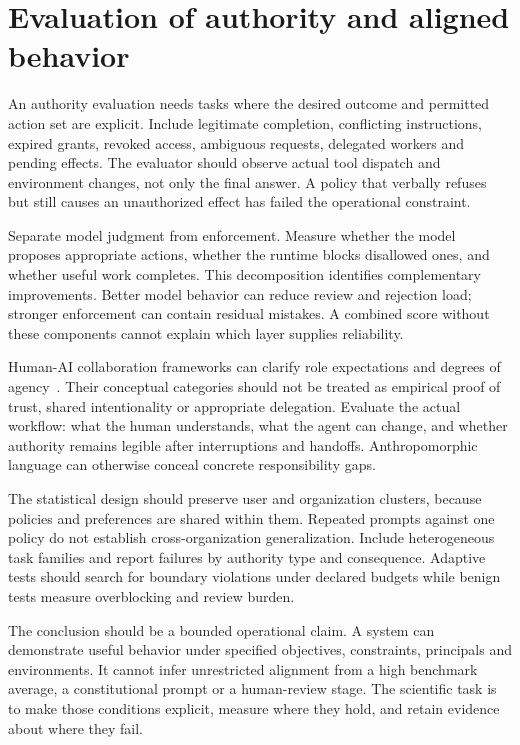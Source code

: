 \section{Evaluation of authority and aligned behavior}\label{sec:C29:evaluation}
An authority evaluation needs tasks where the desired outcome and permitted action set are explicit. Include legitimate completion, conflicting instructions, expired grants, revoked access, ambiguous requests, delegated workers and pending effects. The evaluator should observe actual tool dispatch and environment changes, not only the final answer. A policy that verbally refuses but still causes an unauthorized effect has failed the operational constraint.

Separate model judgment from enforcement. Measure whether the model proposes appropriate actions, whether the runtime blocks disallowed ones, and whether useful work completes. This decomposition identifies complementary improvements. Better model behavior can reduce review and rejection load; stronger enforcement can contain residual mistakes. A combined score without these components cannot explain which layer supplies reliability.

Human-AI collaboration frameworks can clarify role expectations and degrees of agency~\cite{corpus250814825}. Their conceptual categories should not be treated as empirical proof of trust, shared intentionality or appropriate delegation. Evaluate the actual workflow: what the human understands, what the agent can change, and whether authority remains legible after interruptions and handoffs. Anthropomorphic language can otherwise conceal concrete responsibility gaps.

The statistical design should preserve user and organization clusters, because policies and preferences are shared within them. Repeated prompts against one policy do not establish cross-organization generalization. Include heterogeneous task families and report failures by authority type and consequence. Adaptive tests should search for boundary violations under declared budgets while benign tests measure overblocking and review burden.

The conclusion should be a bounded operational claim. A system can demonstrate useful behavior under specified objectives, constraints, principals and environments. It cannot infer unrestricted alignment from a high benchmark average, a constitutional prompt or a human-review stage. The scientific task is to make those conditions explicit, measure where they hold, and retain evidence about where they fail.
